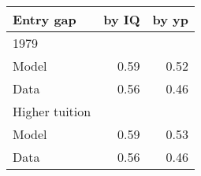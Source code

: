 \begin{tabular}{lrr}
\hline
Entry gap & by IQ  & by yp  \\ 
\hline
1979 &   &   \\ 
Model & 0.59  & 0.52  \\ 
Data & 0.56  & 0.46  \\ 
Higher tuition &   &   \\ 
Model & 0.59  & 0.53  \\ 
Data & 0.56  & 0.46  \\ 
\hline
\end{tabular}%
